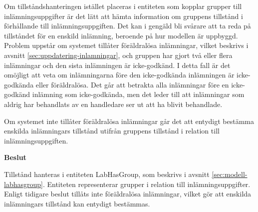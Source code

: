 Om tillståndshanteringen istället placeras i entiteten som kopplar grupper till inlämningsuppgifter är det lätt att hämta information om gruppens tillstånd i förhållande till inlämningsuppgiften. Det kan i gengäld bli svårare att ta reda på tillståndet för en enskild inlämning, beroende på hur modellen är uppbyggd. Problem uppstår om systemet tillåter föräldralösa inlämningar, vilket beskrivs i avsnitt \ref{sec:uppdatering-inlamningar}, och gruppen har gjort två eller flera inlämningar och den sista inlämningen är icke-godkänd. I detta fall är det omöjligt att veta om inlämningarna före den icke-godkända inlämningen är icke-godkända eller föräldralösa. Det går att betrakta alla inlämningar före en icke-godkänd inlämning som icke-godkända, men det leder till att inlämningar som aldrig har behandlats av en handledare ser ut att ha blivit behandlade.

Om systemet inte tillåter föräldralösa inlämningar går det att entydigt bestämma enskilda inlämningars tillstånd utifrån gruppens tillstånd i relation till inlämningsuppgiften.

\begin{flushright}

  \textbf{Beslut}

  Tillstånd hanteras i entiteten LabHasGroup, som beskrivs i avsnitt \ref{sec:modell-labhasgroup}. Entiteten representerar grupper i relation till inlämningsuppgifter. Enligt tidigare beslut tillåts inte föräldralösa inlämningar, vilket gör att enskilda inlämningars tillstånd kan entydigt bestämmas.
\end{flushright}
